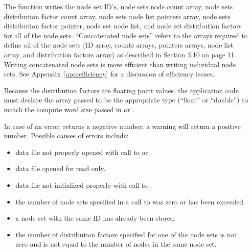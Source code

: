 The function  writes the node set
ID's, node sets node count array, node sets distribution factor count
array, node sets node list pointers array, node sets distribution
factor pointer, node set node list, and node set distribution factors
for all of the node sets. ``Concatenated node sets'' refers to the
arrays required to define all of the node sets (ID array, counts
arrays, pointers arrays, node list array, and distribution factors
array) as described in Section 3.10 on page 11. Writing concatenated
node sets is more efficient than writing individual node sets. See
Appendix~\ref{app:efficiency} for a discussion of efficiency issues.


Because the distribution factors are floating point values, the
application code must declare the array passed to be the appropriate
type (``float'' or ``double'') to match the compute word size passed
in  or .


In case of an error,  returns 
a negative number; a warning will return a positive number. 
Possible causes of errors include:

\begin{itemize}
 \item data file not properly opened with call to  
or 

 \item data file opened for read only.

 \item data file not initialized properly with call to .

 \item the number of node sets specified in a call to
  was zero or has been exceeded.

 \item a node set with the same ID has already been stored.

 \item the number of distribution factors specified for one of the
 node sets is not zero and is not equal to the number of nodes in the
 same node set.
\end{itemize}



